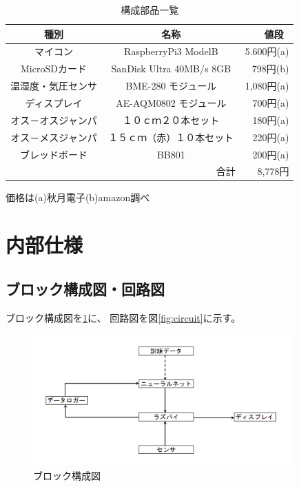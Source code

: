 \documentclass{jsarticle}
\begin{document}
      \begin{center}
        \begin{table}[H]
          \centering
          \caption{構成部品一覧}
          \begin{tabular}{|c|c|r|} \hline
            種別 & 名称 & 値段\ 　 \\ \hline \hline
            マイコン & RaspberryPi3 ModelB & 5.600円(a) \\
            MicroSDカード & SanDisk Ultra 40MB/s 8GB & 798円(b) \\
            温湿度・気圧センサ & BME-280 モジュール & 1,080円(a) \\
            ディスプレイ & AE-AQM0802 モジュール & 700円(a) \\
            オス－オスジャンパ & １０ｃｍ２０本セット & 180円(a) \\
            オス－メスジャンパ & １５ｃｍ（赤）１０本セット & 220円(a) \\
            ブレッドボード & BB801 & 200円(a) \\ \hline \hline
             &  　　　　　　　　　　　    合計 & 8,778円 \\ \hline
          \end{tabular}
        \end{table}
        {\scriptsize 価格は(a)秋月電子(b)amazon調べ}
      \end{center}
    
    \section{内部仕様}
    
      \subsection{ブロック構成図・回路図}
      
        ブロック構成図を\ref{fig:block}に、
        回路図を図\ref{fig:circuit}に示す。
      
        \begin{figure}[htbp]
          \begin{center}
            \includegraphics[clip,width=10.0cm]{img/block}
            \caption{ブロック構成図}
            \label{fig:block}
          \end{center}
        \end{figure}
\end{document}
